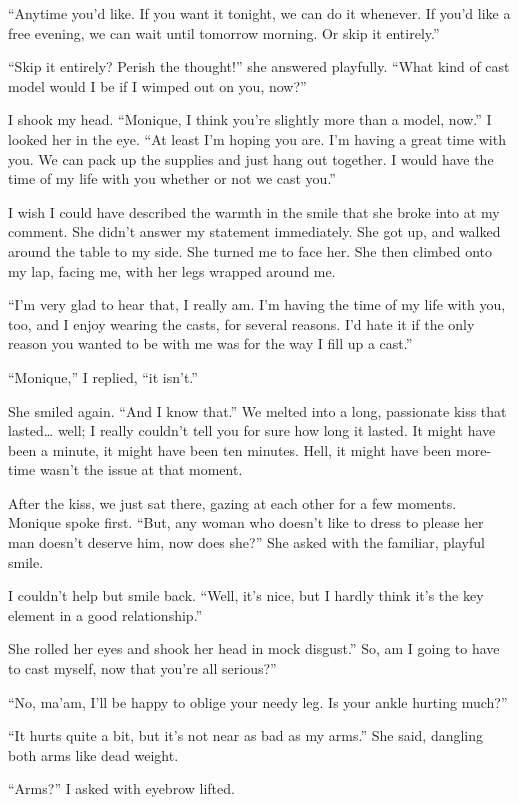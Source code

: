 ``Anytime you'd like. If you want it tonight, we can do it whenever. If you'd like a free
evening, we can wait until tomorrow morning. Or skip it entirely.''

``Skip it entirely? Perish the thought!'' she answered playfully. ``What kind of cast model
would I be if I wimped out on you, now?''

I shook my head. ``Monique, I think you're slightly more than a model, now.'' I looked her in
the eye. ``At least I'm hoping you are. I'm having a great time with you. We can pack up the
supplies and just hang out together. I would have the time of my life with you whether or not we
cast you.''

I wish I could have described the warmth in the smile that she broke into at my comment.
She didn't answer my statement immediately. She got up, and walked around the table to my side.
She turned me to face her. She then climbed onto my lap, facing me, with her legs wrapped around
me.

``I'm very glad to hear that, I really am. I'm having the time of my life with you, too, and
I enjoy wearing the casts, for several reasons. I'd hate it if the only reason you wanted to be
with me was for the way I fill up a cast.''

``Monique,'' I replied, ``it isn't.''

She smiled again. ``And I know that.'' We melted into a long, passionate kiss that lasted…
well; I really couldn't tell you for sure how long it lasted. It might have been a minute, it
might have been ten minutes. Hell, it might have been more- time wasn't the issue at that
moment.

After the kiss, we just sat there, gazing at each other for a few moments. Monique spoke
first. ``But, any woman who doesn't like to dress to please her man doesn't deserve him, now
does
she?'' She asked with the familiar, playful smile.

I couldn't help but smile back. ``Well, it's nice, but I hardly think it's the key element in
a good relationship.''

She rolled her eyes and shook her head in mock disgust.'' So, am I going to have to cast
myself, now that you're all serious?''

``No, ma'am, I'll be happy to oblige your needy leg. Is your ankle hurting much?''

``It hurts quite a bit, but it's not near as bad as my arms.'' She said, dangling both arms
like dead weight.

``Arms?'' I asked with eyebrow lifted.

